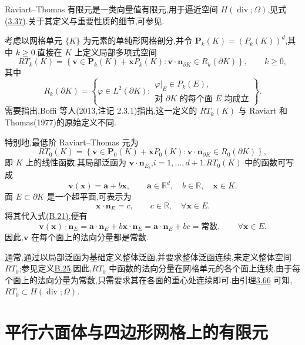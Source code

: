 \begin{example}\label{ex:appendix-b-45}
Raviart--Thomas 有限元是一类向量值有限元,用于逼近空间
$H(\operatorname{div};\Omega)$,见式\hyperref[eq:hdiv-space]{(3.37)}.关于其定义与重要性质的细节,可参见\textcite[第 84 页]{Boffi2013}.

考虑以网格单元 $\{K\}$ 为元素的单纯形网格剖分,并令
$\bm P_k(K)=(P_k(K))^d$,其中 $k\ge0$.直接在 $K$ 上定义局部多项式空间
\[
 RT_k(K)=
 \left\{\bm v\in\bm P_k(K)+\bm xP_k(K):
 \bm v\cdot\bm n_{\partial K}\in R_k(\partial K)\right\},
 \qquad k\ge0,
\]
其中
\[
 R_k(\partial K)=
 \left\{\varphi\in L^2(\partial K):
 \begin{array}{l}
 \varphi|_E\in P_k(E),\\
 \text{对 }\partial K\text{ 的每个面 }E\text{ 均成立}
 \end{array}\right\}.
\]
需要指出,Boffi 等人(2013,注记 2.3.1)指出,这一定义的 $RT_k(K)$ 与 Raviart 和 Thomas(1977)的原始定义不同.

特别地,最低阶 Raviart--Thomas 元为
\[
 RT_0(K)=
 \left\{\bm v\in\bm P_0(K)+\bm xP_0(K):
 \bm v\cdot\bm n_{\partial K}\in R_0(\partial K)\right\},
\]
即 $K$ 上的线性函数.其局部泛函为
$\bm v\cdot\bm n_{E_i}$,$i=1,\ldots,d+1$.$RT_0(K)$ 中的函数可写成
\begin{equation}\label{eq:appendix-b-21}
 \bm v(\bm x)=\bm a+b\bm x,\qquad
 \bm a\in\mathbb R^d,\quad b\in\mathbb R,\quad \bm x\in K.
\end{equation}
面 $E\subset\partial K$ 是一个超平面,可表示为
\[
 \bm x\cdot\bm n_E=c,\qquad
 c\in\mathbb R,\quad \forall\bm x\in E.
\]
将其代入式\hyperref[eq:appendix-b-21]{(B.21)},便有
\[
 \bm v(\bm x)\cdot\bm n_E
 =\bm a\cdot\bm n_E+b\bm x\cdot\bm n_E
 =\bm a\cdot\bm n_E+bc
 =\text{常数},\qquad \forall\bm x\in E.
\]
因此,$\bm v$ 在每个面上的法向分量都是常数.

通常,通过以局部泛函为基础定义整体泛函,并要求整体泛函连续,来定义整体空间 $RT_0$;参见定义\hyperref[def:appendix-b-25]{B.25}.因此,$RT_0$ 中函数的法向分量在网格单元的各个面上连续.由于每个面上的法向分量为常数,只需要求其在各面的重心处连续即可.由引理\hyperref[lem:piecewise-polynomial-hdiv]{3.66} 可知,$RT_0\subset H(\operatorname{div};\Omega)$.
\end{example}

\section{平行六面体与四边形网格上的有限元}\label{sec:appendix-b-4}


